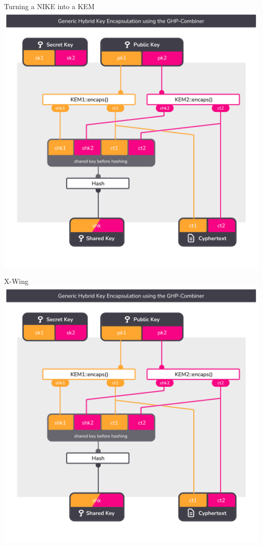 \begin{frame}{Turning a NIKE into a KEM}
  \centering
  \includegraphics[height=\defaultframetextheight,page=2,clip=true,trim={0.5cm 1cm 0.7cm 1.5cm}]{graphics/rosenpass-encapsulation-combiner.pdf}
\end{frame}

\begin{frame}{X-Wing}
  \centering
  \includegraphics[height=\defaultframetextheight,page=3,clip=true,trim={0.5cm 1cm 0.7cm 1.5cm}]{graphics/rosenpass-encapsulation-combiner.pdf}
\end{frame}


